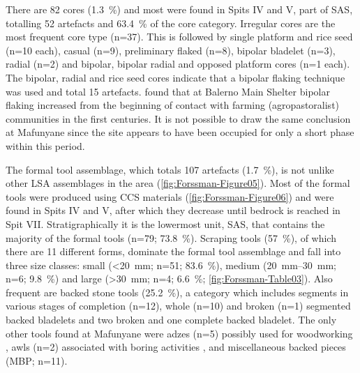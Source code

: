 \documentclass{ijsra}
\begin{document}
There are 82 cores (\SI{1.3}{\percent}) and most were found in Spits IV and V, part of SAS, totalling 52 artefacts and \SI{63.4}{\percent} of the core category. 
Irregular cores are the most frequent core type (n=37). 
This is followed by single platform and rice seed (n=10 each), casual (n=9), preliminary flaked (n=8), bipolar bladelet (n=3), radial (n=2) and bipolar, bipolar radial and opposed platform cores (n=1 each). 
The bipolar, radial and rice seed cores indicate that a bipolar flaking technique was used \parencite[see][]{vanDoornum_2005}
 and total 15 artefacts. 
 \textcite[259]{vanDoornum_2008} found that at Balerno Main Shelter bipolar flaking increased from the beginning of contact with farming (agropastoralist) communities in the first centuries\AD. 
 It is not possible to draw the same conclusion at Mafunyane since the site appears to have been occupied for only a short phase within this period.
 
 The formal tool assemblage, which totals 107  artefacts (\SI{1.7}{\percent}), 
is not unlike other LSA assemblages in the area \parencite{vanDoornum_2005}(\cref{fig:Forssman-Figure05}). 
Most of the formal tools were produced using CCS materials (\cref{fig:Forssman-Figure06})
  and were found in Spits IV and V, after which they decrease until bedrock is reached in Spit VII. Stratigraphically it is the lowermost unit, SAS, that contains the majority of the formal tools (n=79; \SI{73.8}{\percent}). 
  Scraping tools (\SI{57}{\percent}), of which there are 11 different forms,
   dominate the formal tool assemblage and fall into three size classes: 
   small (<\SI{20}{\milli\meter}; n=51; \SI{83.6}{\percent}), 
   medium (\SIrange{20}{30}{\milli\meter}; n=6; \SI{9.8}{\percent}) and large (>\SI{30}{\milli\meter}; n=4; \SI{6.6}{\percent}; 
   \cref{fig:Forssman-Table03}). 
 Also frequent are backed stone tools (\SI{25.2}{\percent}), a category which includes segments in various stages of completion (n=12), 
whole (n=10) and broken (n=1) segmented backed bladelets and two broken and one complete backed bladelet. 
The only other tools found at Mafunyane were adzes (n=5) possibly used for woodworking \parencite{Walker_1994}, awls (n=2) associated with boring activities \parencite{Deacon_1984a}, and miscellaneous backed pieces (MBP; n=11). 
   
\end{document}
